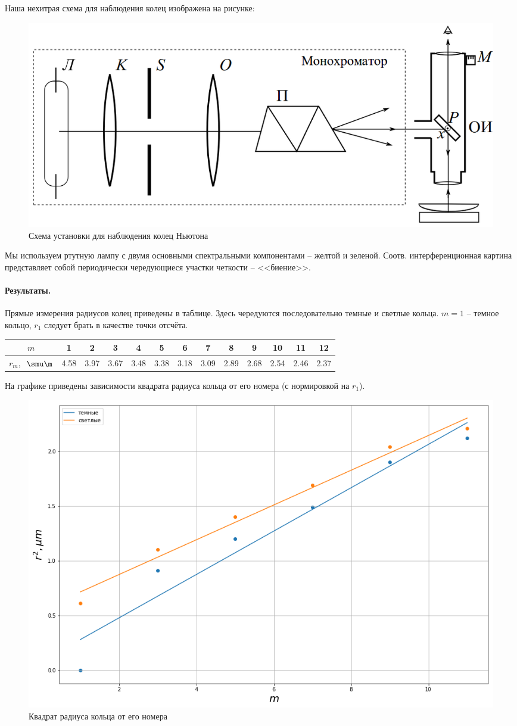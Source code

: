 \documentclass{../lab_class}
\begin{document}
Наша нехитрая схема для наблюдения колец изображена на рисунке:
\begin{figure}[H]
\centering
\includegraphics[width = 0.6 \textwidth]{sch02.png}
\caption{Схема установки для наблюдения колец Ньютона}
	\label{fig:scheme}
\end{figure}
Мы используем ртутную лампу с двумя основными спектральными компонентами -- желтой и зеленой. Соотв. интерференционная картина представляет собой периодически чередующиеся участки четкости -- <<биение>>.

\paragraph{Результаты.}

Прямые измерения радиусов колец приведены в таблице. Здесь чередуются последовательно темные и светлые кольца. $m = 1$ -- темное кольцо, $r_1$ следует брать в качестве точки отсчёта. 

\bigskip

\begin{tabular}{|c|c|c|c|c|c|c|c|c|c|c|c|c|}  \hline
$m$  & 1 & 2 & 3 & 4 & 5 & 6 & 7 & 8 & 9 & 10 & 11 & 12 \\ \hline
$r_m$, $\ \smu \m$  & 4.58 & 3.97 & 3.67 & 3.48 & 3.38 & 3.18 & 3.09 & 2.89 & 2.68 & 2.54 & 2.46 & 2.37 \\ \hline
\end{tabular}

\pagebreak
На графике приведены зависимости квадрата радиуса кольца от его номера (с нормировкой на $r_1$). 

\begin{figure}[H]
\centering
\includegraphics[width = 0.75 \textwidth]{pic.png}
\caption{Квадрат радиуса кольца от его номера}
	\label{fig:main}
\end{figure}
\end{document}
